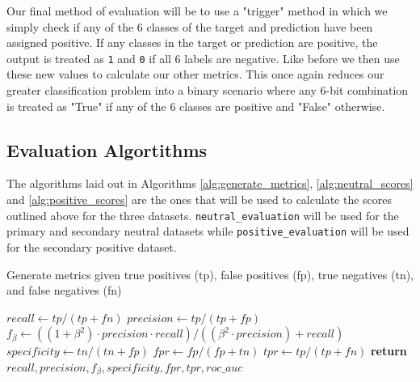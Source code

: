 Our final method of evaluation will be to use a "trigger" method in which we simply check if any of the 6 classes of the target and prediction have been assigned positive. If any classes in the target or prediction are positive, the output is treated as \verb|1| and \verb|0| if all 6 labels are negative. Like before we then use these new values to calculate our other metrics. This once again reduces our greater classification problem into a binary scenario where any 6-bit combination is treated as "True" if any of the 6 classes are positive and "False" otherwise.

\subsection{Evaluation Algortithms}

The algorithms laid out in Algorithms \ref{alg:generate_metrics}, \ref{alg:neutral_scores} and \ref{alg:positive_scores} are the ones that will be used to calculate the scores outlined above for the three datasets. \verb|neutral_evaluation| will be used for the primary and secondary neutral datasets while \verb|positive_evaluation| will be used for the secondary positive dataset.

\begin{algorithm}[H]
    \caption{Generate metrics given true positives (tp), false positives (fp), true negatives (tn), and false negatives (fn)}
    \begin{algorithmic}[1]
        \State $recall \gets tp / (tp + fn)$ 
        \State $precision \gets tp / (tp + fp)$ 
        \State $f_{\beta} \gets ((1 + \beta^2) \cdot precision \cdot recall) / ((\beta^2 \cdot precision) + recall)$ 
        \State $specificity \gets tn / (tn + fp)$ 
        \State
        \State $fpr \gets fp / (fp + tn)$ 
        \State $tpr \gets tp / (tp + fn)$
        \State
        \State \textbf{return} $recall, precision, f_{\beta}, specificity, fpr, tpr, roc\_auc$
        \EndFunction
    \end{algorithmic}
    \label{alg:generate_metrics}
\end{algorithm}



